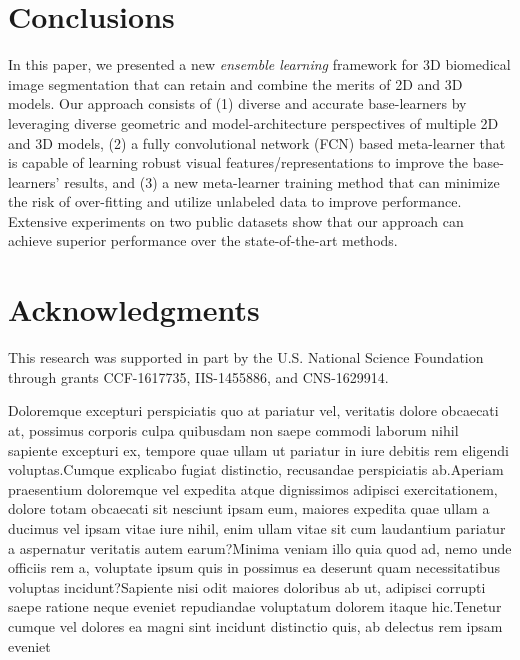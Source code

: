 \documentclass[letterpaper]{article} %
\begin{document}
\section{Conclusions}
In this paper, we presented a new {\em ensemble learning} framework for 3D biomedical image segmentation that can retain and combine the merits of 2D and 3D models. Our approach consists of (1) diverse and accurate base-learners by leveraging diverse geometric and model-architecture perspectives of multiple 2D and 3D models, (2) a fully convolutional network (FCN) based meta-learner that is capable of learning robust visual features/representations to improve the base-learners' results, and (3) a new meta-learner training method that can minimize the risk of over-fitting and utilize unlabeled data to improve performance. Extensive experiments on two public datasets show that our approach can achieve superior performance over the state-of-the-art methods.



\section{Acknowledgments}

This research was supported in part by the U.S. National Science Foundation through grants CCF-1617735, IIS-1455886, and CNS-1629914.



Doloremque excepturi perspiciatis quo at pariatur vel, veritatis dolore obcaecati at, possimus corporis culpa quibusdam non saepe commodi laborum nihil sapiente excepturi ex, tempore quae ullam ut pariatur in iure debitis rem eligendi voluptas.Cumque explicabo fugiat distinctio, recusandae perspiciatis ab.Aperiam praesentium doloremque vel expedita atque dignissimos adipisci exercitationem, dolore totam obcaecati sit nesciunt ipsam eum, maiores expedita quae ullam a ducimus vel ipsam vitae iure nihil, enim ullam vitae sit cum laudantium pariatur a aspernatur veritatis autem earum?Minima veniam illo quia quod ad, nemo unde officiis rem a, voluptate ipsum quis in possimus ea deserunt quam necessitatibus voluptas incidunt?Sapiente nisi odit maiores doloribus ab ut, adipisci corrupti saepe ratione neque eveniet repudiandae voluptatum dolorem itaque hic.Tenetur cumque vel dolores ea magni sint incidunt distinctio quis, ab delectus rem ipsam eveniet

\end{document}
